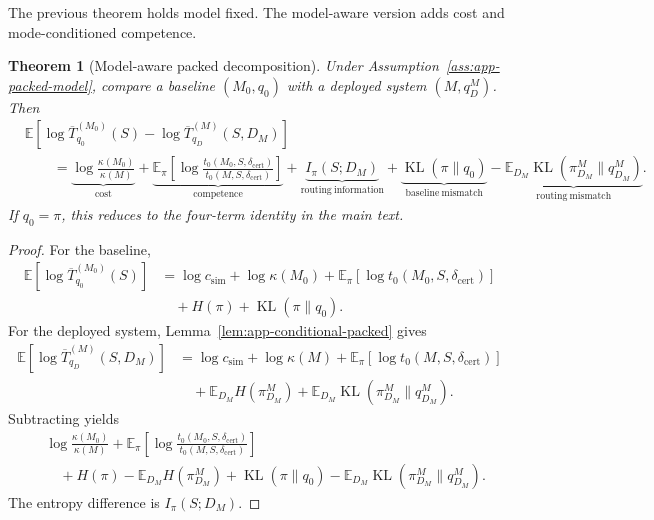\documentclass{article}
\newtheorem{theorem}{Theorem}
\DeclareMathOperator{\KL}{KL}
\newcommand{\E}{\mathbb{E}}
\begin{document}
The previous theorem holds model fixed.
The model-aware version adds cost and mode-conditioned competence.

\begin{theorem}[Model-aware packed decomposition]
\label{thm:app-model-aware}
Under Assumption~\ref{ass:app-packed-model}, compare a baseline \((M_0,q_0)\) with a
deployed system \((M,q_D^M)\).
Then
\[
\boxed{
\begin{aligned}
&\E\!\left[
    \log \overline T^{(M_0)}_{q_0}(S)
    -
    \log \overline T^{(M)}_{q_D}(S,D_M)
\right]
\\
&\qquad =
\underbrace{\log\frac{\kappa(M_0)}{\kappa(M)}}_{\mathrm{cost}}
+
\underbrace{
\E_\pi
\left[
    \log\frac{t_0(M_0,S,\delta_{\mathrm{cert}})}
              {t_0(M,S,\delta_{\mathrm{cert}})}
\right]
}_{\mathrm{competence}}
+
\underbrace{I_\pi(S;D_M)}_{\mathrm{routing\ information}}
+
\underbrace{\KL(\pi\|q_0)}_{\mathrm{baseline\ mismatch}}
-
\underbrace{\E_{D_M}\KL(\pi_{D_M}^M\|q_{D_M}^M)}_{\mathrm{routing\ mismatch}} .
\end{aligned}
}
\]
If \(q_0=\pi\), this reduces to the four-term identity in the main text.
\end{theorem}

\begin{proof}
For the baseline,
\[
\begin{aligned}
    \E[\log \overline T^{(M_0)}_{q_0}(S)]
    &=
    \log c_{\mathrm{sim}}
    +
    \log\kappa(M_0)
    +
    \E_\pi[\log t_0(M_0,S,\delta_{\mathrm{cert}})]
    \\
    &\quad
    +
    H(\pi)
    +
    \KL(\pi\|q_0).
\end{aligned}
\]
For the deployed system, Lemma~\ref{lem:app-conditional-packed} gives
\[
\begin{aligned}
    \E[\log \overline T^{(M)}_{q_D}(S,D_M)]
    &=
    \log c_{\mathrm{sim}}
    +
    \log\kappa(M)
    +
    \E_\pi[\log t_0(M,S,\delta_{\mathrm{cert}})]
    \\
    &\quad
    +
    \E_{D_M}H(\pi_{D_M}^M)
    +
    \E_{D_M}\KL(\pi_{D_M}^M\|q_{D_M}^M).
\end{aligned}
\]
Subtracting yields
\[
\begin{aligned}
&\log\frac{\kappa(M_0)}{\kappa(M)}
+
\E_\pi
\left[
    \log\frac{t_0(M_0,S,\delta_{\mathrm{cert}})}
              {t_0(M,S,\delta_{\mathrm{cert}})}
\right]
\\
&\quad+
H(\pi)-\E_{D_M}H(\pi_{D_M}^M)
+
\KL(\pi\|q_0)
-
\E_{D_M}\KL(\pi_{D_M}^M\|q_{D_M}^M).
\end{aligned}
\]
The entropy difference is \(I_\pi(S;D_M)\).
\end{proof}
\end{document}
